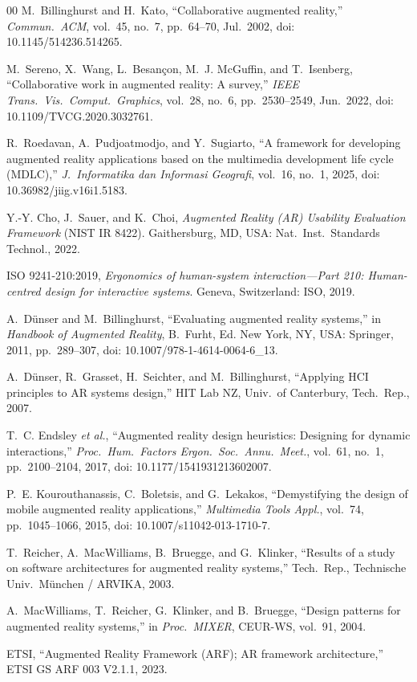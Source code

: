\documentclass[conference]{IEEEtran}
\begin{document}
\begin{thebibliography}{00}
M.~Billinghurst and H.~Kato, ``Collaborative augmented reality,'' \emph{Commun.\ ACM}, vol.~45, no.~7, pp.~64--70, Jul.~2002, doi: 10.1145/514236.514265.

M.~Sereno, X.~Wang, L.~Besan\c{c}on, M.~J. McGuffin, and T.~Isenberg, ``Collaborative work in augmented reality: A survey,'' \emph{IEEE Trans.\ Vis.\ Comput.\ Graphics}, vol.~28, no.~6, pp.~2530--2549, Jun.~2022, doi: 10.1109/TVCG.2020.3032761.

R.~Roedavan, A.~Pudjoatmodjo, and Y.~Sugiarto, ``A framework for developing augmented reality applications based on the multimedia development life cycle (MDLC),'' \emph{J.\ Informatika dan Informasi Geografi}, vol.~16, no.~1, 2025, doi: 10.36982/jiig.v16i1.5183.

Y.-Y. Cho, J.~Sauer, and K.~Choi, \emph{Augmented Reality (AR) Usability Evaluation Framework} (NIST IR 8422). Gaithersburg, MD, USA: Nat.\ Inst.\ Standards Technol., 2022.

ISO 9241-210:2019, \emph{Ergonomics of human-system interaction---Part 210: Human-centred design for interactive systems}. Geneva, Switzerland: ISO, 2019.

A.~D\"unser and M.~Billinghurst, ``Evaluating augmented reality systems,'' in \emph{Handbook of Augmented Reality}, B.~Furht, Ed. New York, NY, USA: Springer, 2011, pp.~289--307, doi: 10.1007/978-1-4614-0064-6\_13.

A.~D\"unser, R.~Grasset, H.~Seichter, and M.~Billinghurst, ``Applying HCI principles to AR systems design,'' HIT Lab NZ, Univ.\ of Canterbury, Tech.\ Rep., 2007.

T.~C. Endsley \textit{et al.}, ``Augmented reality design heuristics: Designing for dynamic interactions,'' \emph{Proc.\ Hum.\ Factors Ergon.\ Soc.\ Annu.\ Meet.}, vol.~61, no.~1, pp.~2100--2104, 2017, doi: 10.1177/1541931213602007.

P.~E. Kourouthanassis, C.~Boletsis, and G.~Lekakos, ``Demystifying the design of mobile augmented reality applications,'' \emph{Multimedia Tools Appl.}, vol.~74, pp.~1045--1066, 2015, doi: 10.1007/s11042-013-1710-7.

T.~Reicher, A.~MacWilliams, B.~Bruegge, and G.~Klinker, ``Results of a study on software architectures for augmented reality systems,'' Tech.\ Rep., Technische Univ.\ M\"unchen / ARVIKA, 2003.

A.~MacWilliams, T.~Reicher, G.~Klinker, and B.~Bruegge, ``Design patterns for augmented reality systems,'' in \emph{Proc.\ MIXER}, CEUR-WS, vol.~91, 2004.

ETSI, ``Augmented Reality Framework (ARF); AR framework architecture,'' ETSI GS ARF 003 V2.1.1, 2023.

\end{thebibliography}
\end{document}
